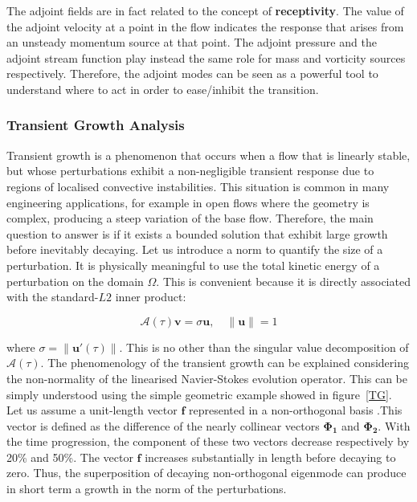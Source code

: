 The adjoint fields are in fact related to the concept of \textbf{receptivity}. The value of the adjoint velocity at a point in the flow indicates the response that arises from an unsteady momentum source at that point. The adjoint pressure and the adjoint stream function play instead the same role for mass and vorticity sources respectively. Therefore, the adjoint modes can be seen as a powerful tool to understand where to act in order to ease/inhibit the transition.

\subsubsection{Transient Growth Analysis}

Transient growth  is a phenomenon that occurs when a flow that is linearly stable, but whose perturbations exhibit a non-negligible transient response due to regions of localised convective instabilities. This situation is common in many engineering applications, for example in open flows where the geometry is complex, producing a steep variation of the base flow. Therefore, the main question to answer is if it exists a bounded solution that exhibit large growth before inevitably decaying. Let us introduce a norm to quantify the size of a perturbation. It is physically meaningful to use the total kinetic energy of a perturbation on the domain $\Omega$. This is convenient because it is directly associated with the
standard-$L2$ inner product:

\begin{equation}
\mathcal{A}(\tau)\mathbf{v}=\sigma \mathbf{u}, \quad \left\| \mathbf{u} \right\|=1
\end{equation}


where $\sigma=\left\| \mathbf{u'}(\tau)\right\|$. This is no other
than the singular value decomposition of $\mathcal{A}(\tau)$. The
phenomenology of the transient growth can be explained considering the
non-normality of the linearised Navier-Stokes evolution operator. This
can be simply understood using the simple geometric example showed in
figure~\ref{TG}. Let us assume a unit-length vector $\mathbf{f}$
represented in a non-orthogonal basis .This vector is defined as the
difference of the nearly collinear vectors $\mathbf{\Phi_1}$ and
$\mathbf{\Phi_2}$.  With the time progression, the component of these
two vectors decrease respectively by 20\% and 50\%. The vector
$\mathbf{f}$ increases substantially in length before decaying to
zero. Thus, the superposition of decaying non-orthogonal eigenmode can
produce in short term a growth in the norm of the perturbations.


